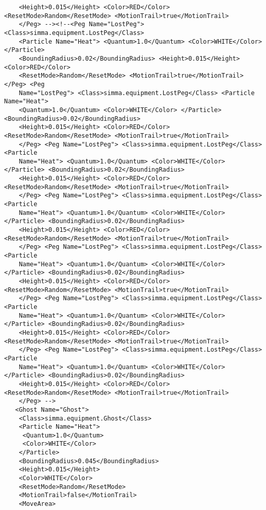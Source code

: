 \documentclass[12pt,fleqn,a4paper]{article}
\begin{document}
\begin{lstlisting}
    <Height>0.015</Height> <Color>RED</Color> <ResetMode>Random</ResetMode> <MotionTrail>true</MotionTrail> 
    </Peg> --><!--<Peg Name="LostPeg"> <Class>simma.equipment.LostPeg</Class> 
    <Particle Name="Heat"> <Quantum>1.0</Quantum> <Color>WHITE</Color> </Particle> 
    <BoundingRadius>0.02</BoundingRadius> <Height>0.015</Height> <Color>RED</Color> 
    <ResetMode>Random</ResetMode> <MotionTrail>true</MotionTrail> </Peg> <Peg 
    Name="LostPeg"> <Class>simma.equipment.LostPeg</Class> <Particle Name="Heat"> 
    <Quantum>1.0</Quantum> <Color>WHITE</Color> </Particle> <BoundingRadius>0.02</BoundingRadius> 
    <Height>0.015</Height> <Color>RED</Color> <ResetMode>Random</ResetMode> <MotionTrail>true</MotionTrail> 
    </Peg> <Peg Name="LostPeg"> <Class>simma.equipment.LostPeg</Class> <Particle 
    Name="Heat"> <Quantum>1.0</Quantum> <Color>WHITE</Color> </Particle> <BoundingRadius>0.02</BoundingRadius> 
    <Height>0.015</Height> <Color>RED</Color> <ResetMode>Random</ResetMode> <MotionTrail>true</MotionTrail> 
    </Peg> <Peg Name="LostPeg"> <Class>simma.equipment.LostPeg</Class> <Particle 
    Name="Heat"> <Quantum>1.0</Quantum> <Color>WHITE</Color> </Particle> <BoundingRadius>0.02</BoundingRadius> 
    <Height>0.015</Height> <Color>RED</Color> <ResetMode>Random</ResetMode> <MotionTrail>true</MotionTrail> 
    </Peg> <Peg Name="LostPeg"> <Class>simma.equipment.LostPeg</Class> <Particle 
    Name="Heat"> <Quantum>1.0</Quantum> <Color>WHITE</Color> </Particle> <BoundingRadius>0.02</BoundingRadius> 
    <Height>0.015</Height> <Color>RED</Color> <ResetMode>Random</ResetMode> <MotionTrail>true</MotionTrail> 
    </Peg> <Peg Name="LostPeg"> <Class>simma.equipment.LostPeg</Class> <Particle 
    Name="Heat"> <Quantum>1.0</Quantum> <Color>WHITE</Color> </Particle> <BoundingRadius>0.02</BoundingRadius> 
    <Height>0.015</Height> <Color>RED</Color> <ResetMode>Random</ResetMode> <MotionTrail>true</MotionTrail> 
    </Peg> <Peg Name="LostPeg"> <Class>simma.equipment.LostPeg</Class> <Particle 
    Name="Heat"> <Quantum>1.0</Quantum> <Color>WHITE</Color> </Particle> <BoundingRadius>0.02</BoundingRadius> 
    <Height>0.015</Height> <Color>RED</Color> <ResetMode>Random</ResetMode> <MotionTrail>true</MotionTrail> 
    </Peg> -->
   <Ghost Name="Ghost">
    <Class>simma.equipment.Ghost</Class>
    <Particle Name="Heat">
     <Quantum>1.0</Quantum>
     <Color>WHITE</Color>
    </Particle>
    <BoundingRadius>0.045</BoundingRadius>
    <Height>0.015</Height>
    <Color>WHITE</Color>
    <ResetMode>Random</ResetMode>
    <MotionTrail>false</MotionTrail>
    <MoveArea>

\end{lstlisting}
\end{document}
